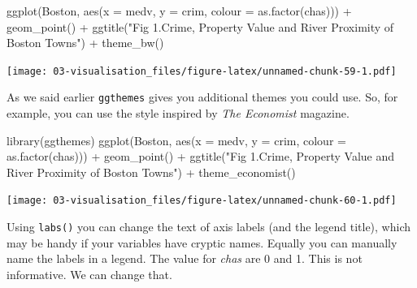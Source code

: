 \documentclass[
]{book}
\newenvironment{Shaded}{\begin{snugshade}}{\end{snugshade}}
\newcommand{\AttributeTok}[1]{\textcolor[rgb]{0.77,0.63,0.00}{#1}}
\newcommand{\FunctionTok}[1]{\textcolor[rgb]{0.00,0.00,0.00}{#1}}
\newcommand{\NormalTok}[1]{#1}
\newcommand{\SpecialCharTok}[1]{\textcolor[rgb]{0.00,0.00,0.00}{#1}}
\newcommand{\StringTok}[1]{\textcolor[rgb]{0.31,0.60,0.02}{#1}}
\begin{document}
\begin{Shaded}
\begin{Highlighting}[]
\FunctionTok{ggplot}\NormalTok{(Boston, }\FunctionTok{aes}\NormalTok{(}\AttributeTok{x =}\NormalTok{ medv, }\AttributeTok{y =}\NormalTok{ crim, }\AttributeTok{colour =} \FunctionTok{as.factor}\NormalTok{(chas))) }\SpecialCharTok{+}
  \FunctionTok{geom\_point}\NormalTok{() }\SpecialCharTok{+}
  \FunctionTok{ggtitle}\NormalTok{(}\StringTok{"Fig 1.Crime, Property Value and River Proximity of Boston Towns"}\NormalTok{) }\SpecialCharTok{+}
  \FunctionTok{theme\_bw}\NormalTok{()}
\end{Highlighting}
\end{Shaded}

\texttt{[image: 03-visualisation\_files/figure-latex/unnamed-chunk-59-1.pdf]}

As we said earlier \texttt{ggthemes} gives you additional themes you could use. So, for example, you can use the style inspired by \emph{The Economist} magazine.

\begin{Shaded}
\begin{Highlighting}[]
\FunctionTok{library}\NormalTok{(ggthemes)}
\FunctionTok{ggplot}\NormalTok{(Boston, }\FunctionTok{aes}\NormalTok{(}\AttributeTok{x =}\NormalTok{ medv, }\AttributeTok{y =}\NormalTok{ crim, }\AttributeTok{colour =} \FunctionTok{as.factor}\NormalTok{(chas))) }\SpecialCharTok{+}
  \FunctionTok{geom\_point}\NormalTok{() }\SpecialCharTok{+}
  \FunctionTok{ggtitle}\NormalTok{(}\StringTok{"Fig 1.Crime, Property Value and River Proximity of Boston Towns"}\NormalTok{) }\SpecialCharTok{+}
  \FunctionTok{theme\_economist}\NormalTok{()}
\end{Highlighting}
\end{Shaded}

\texttt{[image: 03-visualisation\_files/figure-latex/unnamed-chunk-60-1.pdf]}

Using \texttt{labs()} you can change the text of axis labels (and the legend title), which may be handy if your variables have cryptic names. Equally you can manually name the labels in a legend. The value for \emph{chas} are 0 and 1. This is not informative. We can change that.
\end{document}
